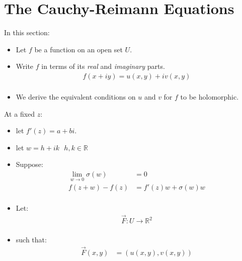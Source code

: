 \section{The Cauchy-Reimann Equations}
In this section:
\begin{itemize}
	\item Let $f$ be a function on an open set $U.$
	\item Write $f$ in terms of its \textit{real} and \textit{imaginary} parts.
	\begin{align*}
		f(x + iy) = u(x, y) + iv(x, y) \\
	\end{align*}
	\item We derive the equivalent conditions on $u$ and $v$ for $f$ to be holomorphic.
\end{itemize}

At a fixed $z$: 
\begin{itemize}
	\item let $f'(z) = a + bi.$
	\item let $w = h + ik \,\,\,\, h, k \in \mathbb{R}$
	\item Suppose:
	\begin{align*}
		\lim_{w \to 0} \sigma(w) &= 0 \\
		f(z + w) - f(z) &= f'(z)w + \sigma(w)w \\
	\end{align*}
	\item Let:
	\begin{align*}
		\vec{F}: U \to \mathbb{R}^2 \\
	\end{align*}
	\item such that:
	\begin{align*}
		\vec{F}(x, y) &= (u(x, y), v(x, y))
	\end{align*}
\end{itemize}


